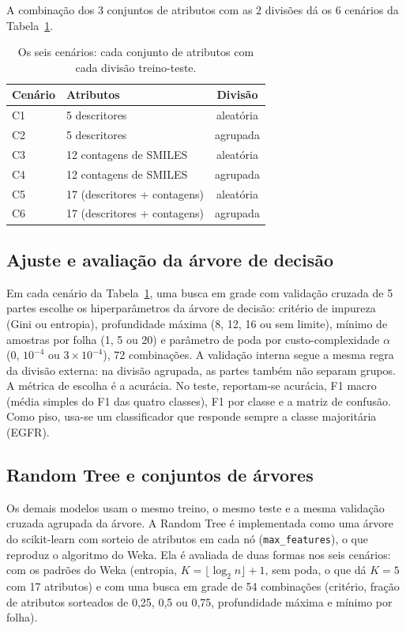 A combinação dos 3 conjuntos de atributos com as 2 divisões dá os 6 cenários da Tabela~\ref{tab:cenarios}.

\begin{table}[ht]
\centering
\caption{Os seis cenários: cada conjunto de atributos com cada divisão treino-teste.}
\label{tab:cenarios}
\small
\begin{tabular}{llc}
\toprule
Cenário & Atributos & Divisão \\
\midrule
C1 & 5 descritores & aleatória \\
C2 & 5 descritores & agrupada \\
C3 & 12 contagens de SMILES & aleatória \\
C4 & 12 contagens de SMILES & agrupada \\
C5 & 17 (descritores + contagens) & aleatória \\
C6 & 17 (descritores + contagens) & agrupada \\
\bottomrule
\end{tabular}
\end{table}

\subsection{Ajuste e avaliação da árvore de decisão}

Em cada cenário da Tabela~\ref{tab:cenarios}, uma busca em grade com validação cruzada de 5 partes escolhe os hiperparâmetros da árvore de decisão: critério de impureza (Gini ou entropia), profundidade máxima (8, 12, 16 ou sem limite), mínimo de amostras por folha (1, 5 ou 20) e parâmetro de poda por custo-complexidade $\alpha$ (0, $10^{-4}$ ou $3\times10^{-4}$), 72 combinações. A validação interna segue a mesma regra da divisão externa: na divisão agrupada, as partes também não separam grupos. A métrica de escolha é a acurácia. No teste, reportam-se acurácia, F1 macro (média simples do F1 das quatro classes), F1 por classe e a matriz de confusão. Como piso, usa-se um classificador que responde sempre a classe majoritária (EGFR).

\subsection{Random Tree e conjuntos de árvores}\label{sec:conjuntos}

Os demais modelos usam o mesmo treino, o mesmo teste e a mesma validação cruzada agrupada da árvore. A Random Tree é implementada como uma árvore do scikit-learn com sorteio de atributos em cada nó (\texttt{max\_features}), o que reproduz o algoritmo do Weka. Ela é avaliada de duas formas nos seis cenários: com os padrões do Weka (entropia, $K = \lfloor \log_2 n \rfloor + 1$, sem poda, o que dá $K = 5$ com 17 atributos) e com uma busca em grade de 54 combinações (critério, fração de atributos sorteados de 0,25, 0,5 ou 0,75, profundidade máxima e mínimo por folha).

